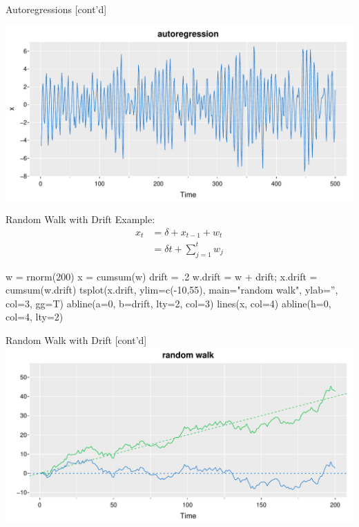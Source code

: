 \documentclass[ignorenonframetext,xcolor=x11names]{beamer}
\begin{document}
\begin{frame}{Autoregressions \small [cont'd]}
\centering

\includegraphics[width=\textwidth]{figure3.pdf}
\end{frame}

\begin{frame}[fragile]{Random Walk with Drift}
Example:
\begin{align*}x_t &= \delta + x_{t-1} + w_t \\
&= \delta t + \sum_{j=1}^t w_j\end{align*}
\begin{Rcode}
w = rnorm(200)
x = cumsum(w)
drift = .2
w.drift = w + drift;
x.drift = cumsum(w.drift)
tsplot(x.drift, ylim=c(-10,55), 
       main="random walk", ylab='', col=3, gg=T)
abline(a=0, b=drift, lty=2, col=3)
lines(x, col=4)
abline(h=0, col=4, lty=2)
\end{Rcode}
\end{frame}

\begin{frame}{Random Walk with Drift \small [cont'd]}
\includegraphics[width=\textwidth]{figure4.pdf}
\end{frame}
\end{document}
